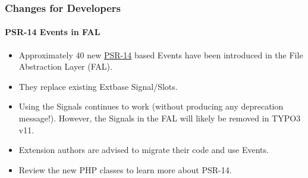 \begin{frame}[fragile]
	\frametitle{Changes for Developers}
	\framesubtitle{PSR-14 Events in FAL}

	\lstset{basicstyle=\tiny\ttfamily}

	\begin{itemize}
		\item Approximately 40 new
			\href{https://www.php-fig.org/psr/psr-14/}{PSR-14}
			based Events have been introduced in the File Abstraction Layer (FAL).
		\item They replace existing Extbase Signal/Slots.
		\item Using the Signals continues to work (without producing any deprecation message!).
			However, the Signals in the FAL will likely be removed in TYPO3 v11.
		\item Extension authors are advised to migrate their code and use Events.
		\item Review the new PHP classes to learn more about PSR-14.
	\end{itemize}

\end{frame}



